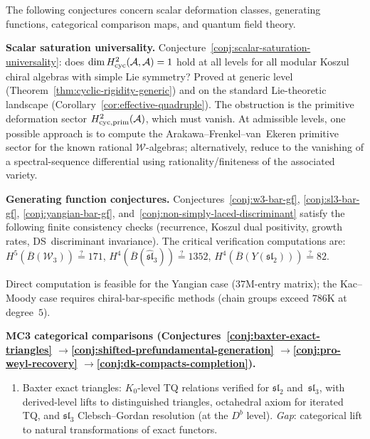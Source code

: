 \begin{remark}
\label{rem:conjecture-attack-strategies}
The following conjectures concern scalar deformation classes, generating
functions, categorical comparison maps, and quantum field theory.

\smallskip\noindent
\textbf{Scalar saturation universality.}
Conjecture~\ref{conj:scalar-saturation-universality}: does
$\dim H^2_{\mathrm{cyc}}(\mathcal{A},\mathcal{A}) = 1$ hold at all levels for all
modular Koszul chiral algebras with simple Lie symmetry?
Proved at generic level
(Theorem~\ref{thm:cyclic-rigidity-generic}) and on the standard
Lie-theoretic landscape
(Corollary~\ref{cor:effective-quadruple}).
The obstruction is the primitive deformation sector
$H^2_{\mathrm{cyc,prim}}(\mathcal{A})$, which must vanish.
At admissible levels, one possible approach is to compute the
Arakawa--Frenkel--van~Ekeren primitive sector for the
known rational $\mathcal{W}$-algebras; alternatively, reduce to
the vanishing of a spectral-sequence differential using
rationality/finiteness of the associated variety.

\smallskip\noindent
\textbf{Generating function conjectures.}
Conjectures~\ref{conj:w3-bar-gf}, \ref{conj:sl3-bar-gf},
\ref{conj:yangian-bar-gf}, and~\ref{conj:non-simply-laced-discriminant}
satisfy the following finite consistency checks
(recurrence, Koszul dual positivity, growth rates, DS~discriminant
invariance).  The critical verification computations are:
$H^5(\overline{B}(\mathcal{W}_3)) \stackrel{?}{=} 171$,
$H^4(\overline{B}(\widehat{\mathfrak{sl}}_3)) \stackrel{?}{=} 1352$,
$H^4(\overline{B}(Y(\mathfrak{sl}_2))) \stackrel{?}{=} 82$.

Direct computation is feasible for the Yangian case ($37$M-entry
matrix); the Kac--Moody case requires chiral-bar-specific methods
(chain groups exceed $786$K at degree~$5$).

\smallskip\noindent
\textbf{MC3 categorical comparisons
(Conjectures~\ref{conj:baxter-exact-triangles}%
$\to$\ref{conj:shifted-prefundamental-generation}%
$\to$\ref{conj:pro-weyl-recovery}%
$\to$\ref{conj:dk-compacts-completion}).}
\begin{enumerate}[label=\textup{(\roman*)},nosep]
\item Baxter exact triangles: $K_0$-level TQ relations verified for $\mathfrak{sl}_2$ and~$\mathfrak{sl}_3$, with
  derived-level lifts to distinguished triangles, octahedral axiom
  for iterated TQ, and $\mathfrak{sl}_3$ Clebsch--Gordan resolution
  (at the $D^b$ level).
  \emph{Gap}: categorical lift to natural transformations of exact functors.


\end{enumerate}
\end{remark}
